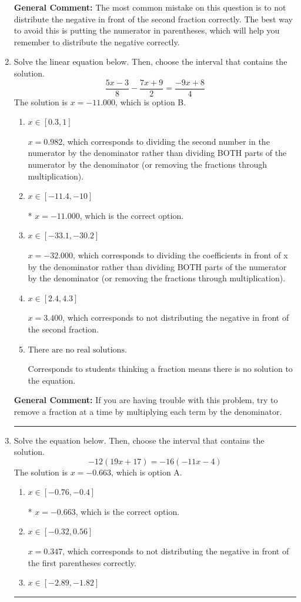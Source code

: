 \documentclass{extbook}[14pt]
\newcommand{\litem}[1]{\item #1

\rule{\textwidth}{0.4pt}}
\begin{document}
\begin{enumerate}
{\textbf{General Comment:} The most common mistake on this question is to not distribute the negative in front of the second fraction correctly. The best way to avoid this is putting the numerator in parentheses, which will help you remember to distribute the negative correctly.
}
\litem{
Solve the linear equation below. Then, choose the interval that contains the solution.
\[ \frac{5x -3}{8} - \frac{7x + 9}{2} = \frac{-9x + 8}{4} \]The solution is \( x = -11.000 \), which is option B.\begin{enumerate}[label=\Alph*.]
\item \( x \in [0.3, 1] \)

 $x = 0.982$, which corresponds to dividing the second number in the numerator by the denominator rather than dividing BOTH parts of the numerator by the denominator (or removing the fractions through multiplication).
\item \( x \in [-11.4, -10] \)

* $x = -11.000$, which is the correct option.
\item \( x \in [-33.1, -30.2] \)

 $x = -32.000$, which corresponds to dividing the coefficients in front of x by the denominator rather than dividing BOTH parts of the numerator by the denominator (or removing the fractions through multiplication).
\item \( x \in [2.4, 4.3] \)

 $x = 3.400$, which corresponds to not distributing the negative in front of the second fraction.
\item \( \text{There are no real solutions.} \)

Corresponds to students thinking a fraction means there is no solution to the equation.
\end{enumerate}

\textbf{General Comment:} If you are having trouble with this problem, try to remove a fraction at a time by multiplying each term by the denominator.
}
\litem{
Solve the equation below. Then, choose the interval that contains the solution.
\[ -12(19x + 17) = -16(-11x -4) \]The solution is \( x = -0.663 \), which is option A.\begin{enumerate}[label=\Alph*.]
\item \( x \in [-0.76, -0.4] \)

* $x = -0.663$, which is the correct option.
\item \( x \in [-0.32, 0.56] \)

$x = 0.347$, which corresponds to not distributing the negative in front of the first parentheses correctly.
\item \( x \in [-2.89, -1.82] \)


\end{enumerate}}
\end{enumerate}
\end{document}
